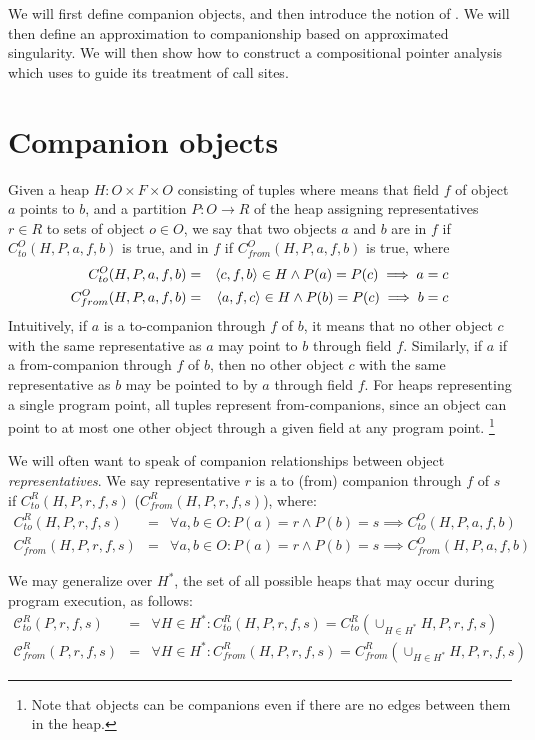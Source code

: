 \documentclass[11pt,notitlepage]{article}
\begin{document}
We will first define companion objects, and then introduce the notion
of .  We will then define an approximation to
companionship based on approximated singularity.  We will then show
how to construct a compositional pointer analysis which uses
 to guide its treatment of call sites.

\section{Companion objects}
Given a heap $H: O\times F\times O$ consisting of tuples where
 means that field $f$ of object $a$ points to $b$, and a
partition $P:O\to R$ of the heap assigning representatives $r\in R$ to
sets of object $o\in O$, we say that two objects $a$ and $b$ are
 in $f$ if $C_{to}^O(H,P,a,f,b)$ is true, and
 in $f$ if $C_{from}^O(H,P,a,f,b)$ is true,
where
\begin{eqnarray*}
C_{to}^O(H,P,a,f,b) &=& \left\langle c,f,b \right\rangle\in H \wedge P(a)=P(c) \implies a=c
\\
C_{from}^O(H,P,a,f,b) &=& \left\langle a,f,c \right\rangle\in H \wedge P(b)=P(c) \implies b=c
\end{eqnarray*}
Intuitively, if $a$ is a to-companion through $f$ of $b$, it means
that no other object $c$ with the same representative as $a$ may point
to $b$ through field $f$.  Similarly, if $a$ if a from-companion
through $f$ of $b$, then no other object $c$ with the same
representative as $b$ may be pointed to by $a$ through field $f$.
For heaps representing a single program point, all tuples
 represent from-companions, since an object can point to
at most one other object through a given field at any program point.%
\footnote{Note that objects can be companions even if there are no
edges between them in the heap.}

We will often want to speak of companion relationships between object
\textit{representatives}.  We say representative $r$ is a to (from)
companion through $f$ of $s$ if $C_{to}^R(H,P,r,f,s)$
($C_{from}^R(H,P,r,f,s)$), where:
\begin{eqnarray*}
C_{to}^R(H,P,r,f,s) &=& \forall a,b\in O : P(a)=r \wedge P(b)=s \implies C_{to}^O(H,P,a,f,b)
\\
C_{from}^R(H,P,r,f,s) &=& \forall a,b\in O : P(a)=r \wedge P(b)=s \implies C_{from}^O(H,P,a,f,b)
\end{eqnarray*}

We may generalize over $H^*$, the set of all possible heaps that may occur
during program execution, as follows:
\begin{eqnarray*}
\mathcal{C}_{to}^R(P,r,f,s) &=& \forall H\in H^*: C_{to}^R(H,P,r,f,s)
 = C_{to}^R(\cup_{H\in H^*} H, P, r, f, s)
\\
\mathcal{C}_{from}^R(P,r,f,s) &=& \forall H\in H^*: C_{from}^R(H,P,r,f,s)
 = C_{from}^R(\cup_{H\in H^*} H, P, r, f, s)
\end{eqnarray*}
\end{document}
